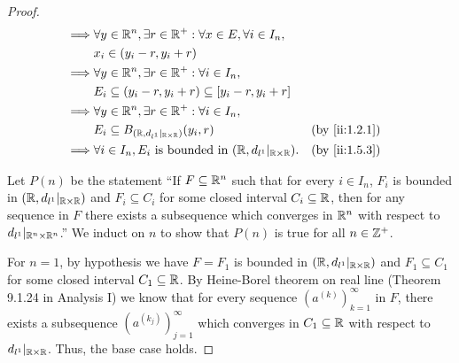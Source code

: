 \begin{proof}
\begin{align*}
    \implies & \forall y \in \R^n, \exists r \in \R^+ : \forall x \in E, \forall i \in I_n,                                                     \\
             & x_i \in (y_i - r, y_i + r)                                                                                                       \\
    \implies & \forall y \in \R^n, \exists r \in \R^+ : \forall i \in I_n,                                                                      \\
             & E_i \subseteq (y_i - r, y_i + r) \subseteq [y_i - r, y_i + r]                                                                    \\
    \implies & \forall y \in \R^n, \exists r \in \R^+ : \forall i \in I_n,                                                                      \\
             & E_i \subseteq B_{(\R, d_{l^1}|_{\R \times \R})}(y_i, r)                                                       &  & \by{ii:1.2.1} \\
    \implies & \forall i \in I_n, E_i \text{ is bounded in } (\R, d_{l^1}|_{\R \times \R}).                                  &  & \by{ii:1.5.3}
  \end{align*}

  Let \(P(n)\) be the statement ``If \(F \subseteq \mathbb{R}^n\) such that for every \(i \in I_n\), \(F_i\) is bounded in \((\mathbb{R}, d_{l^1}|_{\mathbb{R} \times \mathbb{R}})\) and \(F_i \subseteq C_i\) for some closed interval \(C_i \subseteq \mathbb{R}\), then for any sequence in \(F\) there exists a subsequence which converges in \(\mathbb{R}^n\) with respect to \(d_{l^1}|_{\mathbb{R}^n \times \mathbb{R}^n}\).''
  We induct on \(n\) to show that \(P(n)\) is true for all \(n \in \mathbb{Z}^+\).

  For \(n = 1\), by hypothesis we have \(F = F_1\) is bounded in \((\mathbb{R}, d_{l^1}|_{\mathbb{R} \times \mathbb{R}})\) and \(F_1 \subseteq C_1\) for some closed interval \(C_1 \subseteq \mathbb{R}\).
  By Heine-Borel theorem on real line (Theorem 9.1.24 in Analysis I) we know that for every sequence \((a^{(k)})_{k = 1}^\infty\) in \(F\), there exists a subsequence \((a^{(k_j)})_{j = 1}^\infty\) which converges in \(C_1 \subseteq \mathbb{R}\) with respect to \(d_{l^1}|_{\mathbb{R} \times \mathbb{R}}\).
  Thus, the base case holds.


\end{proof}

